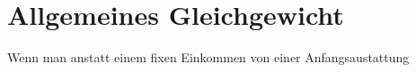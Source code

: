 \chapter{Allgemeines Gleichgewicht}

Wenn man anstatt einem fixen Einkommen von einer Anfangsaustattung
